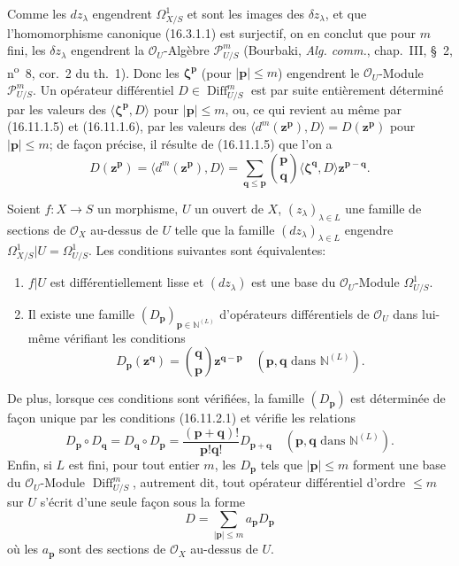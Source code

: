 \begin{env}[16.11.1]
Comme les $dz_\lambda$ engendrent $\Omega_{X/S}^1$ et sont les images des
$\delta z_\lambda$, et que l'homomorphisme canonique (16.3.1.1) est
surjectif, on en conclut que pour $m$ fini, les $\delta z_\lambda$ engendrent
la $\mathcal{O}_U$-Algèbre $\mathscr{P}_{U/S}^m$ (Bourbaki,
\emph{Alg. comm.}, chap.~III, §~2, n\textsuperscript{o}~8, cor.~2 du th.~1).
Donc les $\boldsymbol{\zeta}^{\mathbf{p}}$ (pour $|\mathbf{p}|\leq m$)
engendrent le $\mathcal{O}_U$-Module $\mathscr{P}_{U/S}^m$. Un opérateur
différentiel $D\in\operatorname{Diff}_{U/S}^m$ est par suite entièrement
déterminé par les valeurs des
$\langle\boldsymbol{\zeta}^{\mathbf{p}},D\rangle$ pour
$|\mathbf{p}|\leq m$, ou, ce qui revient au même par (16.11.1.5) et
(16.11.1.6), par les valeurs
des $\langle d^m(\mathbf{z}^{\mathbf{p}}),D\rangle=D(\mathbf{z}^{\mathbf{p}})$
pour $|\mathbf{p}|\leq m$; de façon précise, il résulte de (16.11.1.5) que
l'on a
\[
  D(\mathbf{z}^{\mathbf{p}})
  =\langle d^m(\mathbf{z}^{\mathbf{p}}),D\rangle
  =\sum_{\mathbf{q}\leq\mathbf{p}}
    \binom{\mathbf{p}}{\mathbf{q}}
    \langle\boldsymbol{\zeta}^{\mathbf{q}},D\rangle
    \mathbf{z}^{\mathbf{p}-\mathbf{q}}.
  \tag{16.11.1.7}
  \label{IV.16.11.1.7}
\]
\end{env}

\begin{theorem}[16.11.2]
\label{IV.16.11.2}
Soient $f:X\to S$ un morphisme, $U$ un ouvert de $X$,
$(z_\lambda)_{\lambda\in L}$ une famille de sections de $\mathcal{O}_X$
au-dessus de $U$ telle que la famille $(dz_\lambda)_{\lambda\in L}$ engendre
$\Omega_{X/S}^1|U=\Omega_{U/S}^1$. Les conditions suivantes sont
équivalentes:
\begin{enumerate}
  \item[a)] $f|U$ est différentiellement lisse et $(dz_\lambda)$ est une base
  du $\mathcal{O}_U$-Module $\Omega_{U/S}^1$.
  \item[b)] Il existe une famille
  $(D_{\mathbf{p}})_{\mathbf{p}\in\mathbb{N}^{(L)}}$ d'opérateurs
  différentiels de $\mathcal{O}_U$ dans lui-même vérifiant les conditions
  \[
    D_{\mathbf{p}}(\mathbf{z}^{\mathbf{q}})
    =\binom{\mathbf{q}}{\mathbf{p}}
      \mathbf{z}^{\mathbf{q}-\mathbf{p}}
    \quad(\mathbf{p},\mathbf{q}\text{ dans }\mathbb{N}^{(L)}).
    \tag{16.11.2.1}
    \label{IV.16.11.2.1}
  \]
\end{enumerate}
De plus, lorsque ces conditions sont vérifiées, la famille
$(D_{\mathbf{p}})$ est déterminée de façon unique par les conditions
(16.11.2.1) et vérifie les relations
\[
  D_{\mathbf{p}}\circ D_{\mathbf{q}}
  =D_{\mathbf{q}}\circ D_{\mathbf{p}}
  =\frac{(\mathbf{p}+\mathbf{q})!}{\mathbf{p}!\mathbf{q}!}
    D_{\mathbf{p}+\mathbf{q}}
  \quad(\mathbf{p},\mathbf{q}\text{ dans }\mathbb{N}^{(L)}).
  \tag{16.11.2.2}
  \label{IV.16.11.2.2}
\]
Enfin, si $L$ est fini, pour tout entier $m$, les $D_{\mathbf{p}}$ tels que
$|\mathbf{p}|\leq m$ forment une base du $\mathcal{O}_U$-Module
$\operatorname{Diff}_{U/S}^m$, autrement dit, tout opérateur différentiel
d'ordre $\leq m$ sur $U$ s'écrit d'une seule façon sous la forme
\[
  D=\sum_{|\mathbf{p}|\leq m}a_{\mathbf{p}}D_{\mathbf{p}}
\]
où les $a_{\mathbf{p}}$ sont des sections de $\mathcal{O}_X$ au-dessus de
$U$.
\end{theorem}

